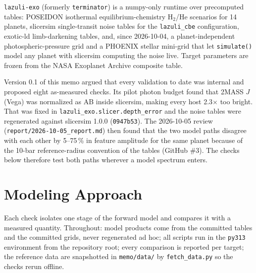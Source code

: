 \documentclass[11pt]{article}
\begin{document}
\texttt{lazuli-exo} (formerly \texttt{terminator}) is a numpy-only runtime over precomputed tables: POSEIDON isothermal equilibrium-chemistry H$_2$/He scenarios for 14 planets, slicersim single-transit noise tables for the \texttt{lazuli\_cbe} configuration, exotic-ld limb-darkening tables, and, since 2026-10-04, a planet-independent photospheric-pressure grid and a PHOENIX stellar mini-grid that let \texttt{simulate()} model any planet with slicersim computing the noise live. Target parameters are frozen from the NASA Exoplanet Archive composite table.

Version 0.1 of this memo argued that every validation to date was internal and proposed eight as-measured checks. Its pilot photon budget found that 2MASS $J$ (Vega) was normalized as AB inside slicersim, making every host 2.3$\times$ too bright. That was fixed in \texttt{lazuli\_exo.slicer.depth\_error} and the noise tables were regenerated against slicersim 1.0.0 (\texttt{0947b53}). The 2026-10-05 review (\texttt{report/2026-10-05\_report.md}) then found that the two model paths disagree with each other by 5--75\,\% in feature amplitude for the same planet because of the 10-bar reference-radius convention of the tables (GitHub \#3). The checks below therefore test both paths wherever a model spectrum enters.

\section*{Modeling Approach}

Each check isolates one stage of the forward model and compares it with a measured quantity. Throughout: model products come from the committed tables and the committed grids, never regenerated ad hoc; all scripts run in the \texttt{py313} environment from the repository root; every comparison is reported per target; the reference data are snapshotted in \texttt{memo/data/} by \texttt{fetch\_data.py} so the checks rerun offline.
\end{document}
